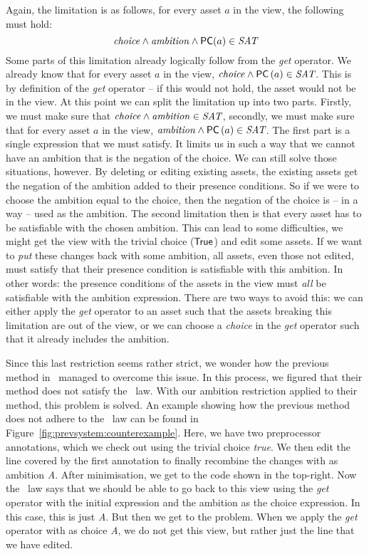 Again, the limitation is as follows, for every asset $a$ in the view, the
following must hold:
\[
  \mathit{choice} \land \mathit{ambition} \land {\sf PC}(a) \in \textit{SAT}
\]
Some parts of this limitation already logically follow from the \emph{get}
operator. We already know that for every asset $a$ in the view, \(\mathit{choice} \land {\sf PC}\left(a\right) \in \textit{SAT}\). 
This is by definition of the \emph{get} operator -- if this would not hold, the
asset would not be in the view. At this point we can split the limitation up
into two parts. Firstly, we must make sure that \(\mathit{choice} \land \mathit{ambition} \in \textit{SAT}\),
secondly, we must make sure that for every asset $a$ in the view, \(\mathit{ambition} \land {\sf PC}\left(a\right) \in \textit{SAT}\).
The first part is a single expression that we must satisfy. It limits us in
such a way that we cannot have an ambition that is the negation of the choice.
We can still solve those situations, however. By deleting or editing
existing assets, the existing assets get the negation of the ambition added to
their presence conditions. So if we were to choose the ambition equal to the
choice, then the negation of the choice is -- in a way -- used as the ambition.
The second limitation then is that every asset has to be satisfiable with the
chosen ambition. This can lead to some difficulties, we might get the view
with the trivial choice (\({\sf True}\)) and edit some assets. If we want
to \emph{put} these changes back with some ambition, all assets, even those not
edited, must satisfy that their presence condition is satisfiable with this
ambition. In other words: the presence conditions of the assets in the view
must \emph{all} be satisfiable with the ambition expression. There are two ways
to avoid this: we can either apply the \emph{get} operator to an asset such that
the assets breaking this limitation are out of the view, or we can choose a
\emph{choice} in the \emph{get} operator such that it already includes the ambition.

Since this last restriction seems rather strict, we wonder how the previous
method in~\cite{stuanciulescu2016} managed to overcome this issue. In this
process, we figured that their method does not satisfy the \putget~law.
With our ambition restriction applied to their method, this problem is solved. An
example showing how the previous method does not adhere to the \putget~law can
be found in Figure~\ref{fig:prevsystem:counterexample}. Here, we have two
preprocessor annotations, which we check out using the trivial choice
\emph{true}. We then edit the line covered by the first annotation to finally
recombine the changes with as ambition \emph{A}. After minimisation, we get to
the code shown in the top-right. Now the \putget~law says that we should be
able to go back to this view using the \emph{get} operator with the initial
expression and the ambition as the choice expression. In this case, this is just
\emph{A}. But then we get to the problem. When we apply the \emph{get} operator
with as choice \emph{A}, we do not get this view, but rather just the line that
we have edited.

